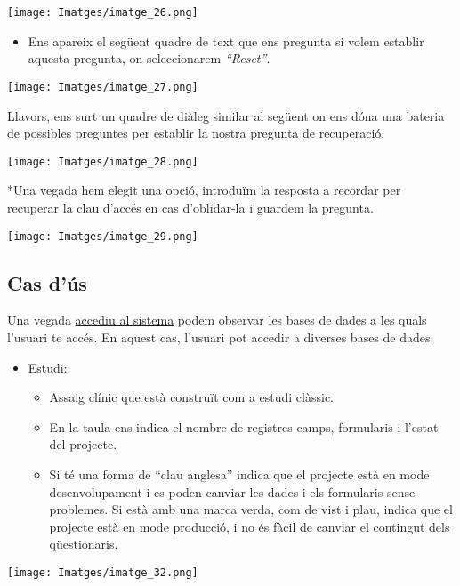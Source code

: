 \documentclass[
]{article}
\providecommand{\tightlist}{%
  \setlength{\itemsep}{0pt}\setlength{\parskip}{0pt}}
\begin{document}
\texttt{[image: Imatges/imatge\_26.png]}

\begin{itemize}
\tightlist
\item
  Ens apareix el següent quadre de text que ens pregunta si volem establir aquesta pregunta, on seleccionarem \emph{``Reset''}.
\end{itemize}

\texttt{[image: Imatges/imatge\_27.png]}

Llavors, ens surt un quadre de diàleg similar al següent on ens dóna una bateria de possibles preguntes per establir la nostra pregunta de recuperació.

\texttt{[image: Imatges/imatge\_28.png]}

*Una vegada hem elegit una opció, introduïm la resposta a recordar per recuperar la clau d'accés en cas d'oblidar-la i guardem la pregunta.

\texttt{[image: Imatges/imatge\_29.png]}

\hypertarget{cas-duxfas}{%
\subsection{\texorpdfstring{\textbf{Cas d'ús}}{Cas d'ús}}\label{cas-duxfas}}

Una vegada \href{https://servirredcap.vhir.org/redcap/}{accediu al sistema} podem observar les bases de dades a les quals l'usuari te accés. En aquest cas, l'usuari pot accedir a diverses bases de dades.

\begin{itemize}
\tightlist
\item
  Estudi:

  \begin{itemize}
  \tightlist
  \item
    Assaig clínic que està construït com a estudi clàssic.
  \item
    En la taula ens indica el nombre de registres camps, formularis i l'estat del projecte.
  \item
    Si té una forma de ``clau anglesa'' indica que el projecte està en mode desenvolupament i es poden canviar les dades i els formularis sense problemes. Si està amb una marca verda, com de vist i plau, indica que el projecte està en mode producció, i no és fàcil de canviar el contingut dels qüestionaris.
  \end{itemize}
\end{itemize}

\texttt{[image: Imatges/imatge\_32.png]}
\end{document}
